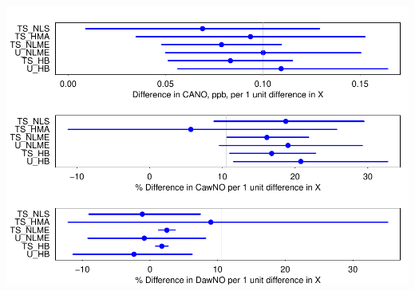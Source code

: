 \documentclass[
]{article}
\begin{document}
\includegraphics{DeMO_files/figure-latex/plotresults-1.pdf}
\end{document}
